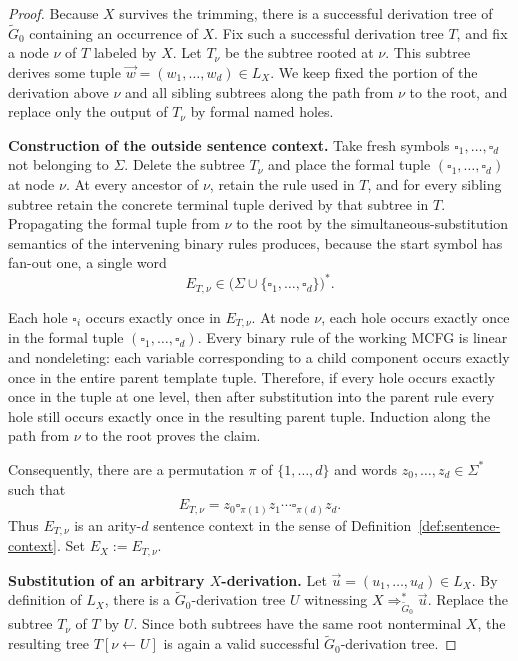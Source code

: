 \documentclass[11pt,a4paper]{article}
\theoremstyle{remark}
\newcommand{\tuple}[1]{\vec{#1}}
\newcommand{\blank}{\square}
\begin{document}
\begin{proof}
Because \(X\) survives the trimming, there is a successful derivation tree of
\(\widetilde G_0\) containing an occurrence of \(X\).  Fix such a successful
derivation tree \(T\), and fix a node \(\nu\) of \(T\) labeled by \(X\).  Let
\(T_\nu\) be the subtree rooted at \(\nu\).  This subtree derives some tuple
\(\tuple w=(w_1,\ldots,w_d)\in L_X\).
We keep fixed the portion of the derivation above \(\nu\) and all sibling
subtrees along the path from \(\nu\) to the root, and replace only the output of
\(T_\nu\) by formal named holes.

\medskip
\noindent
\textbf{Construction of the outside sentence context.}
Take fresh symbols \(\blank_1,\ldots,\blank_d\) not belonging to \(\Sigma\).
Delete the subtree \(T_\nu\) and place the formal tuple
\((\blank_1,\ldots,\blank_d)\) at node \(\nu\).  At every ancestor of \(\nu\), retain the rule used in \(T\),
and for every sibling subtree retain the concrete terminal tuple derived by
that subtree in \(T\).  Propagating the formal tuple from \(\nu\) to the root
by the simultaneous-substitution semantics of the intervening binary rules
produces, because the start symbol has fan-out one, a single word
\[
  E_{T,\nu}
  \in
  \bigl(
    \Sigma\cup\{\blank_1,\ldots,\blank_d\}
  \bigr)^*.
\]

Each hole \(\blank_i\) occurs exactly once in \(E_{T,\nu}\).  At node \(\nu\),
each hole occurs exactly once in the formal tuple
\((\blank_1,\ldots,\blank_d)\).  Every binary rule of the working MCFG is
linear and nondeleting: each variable corresponding to a child component
occurs exactly once in the entire parent template tuple.  Therefore, if every
hole occurs exactly once in the tuple at one level, then after substitution
into the parent rule every hole still occurs exactly once in the resulting
parent tuple.  Induction along the path from \(\nu\) to the root proves the
claim.

Consequently, there are a permutation \(\pi\) of \(\{1,\ldots,d\}\) and
words \(z_0,\ldots,z_d\in\Sigma^*\) such that
\[
  E_{T,\nu}
  =
  z_0\blank_{\pi(1)}z_1
  \cdots
  \blank_{\pi(d)}z_d.
\]
Thus \(E_{T,\nu}\) is an arity-\(d\) sentence context in the sense of
Definition~\ref{def:sentence-context}.  Set \(E_X:=E_{T,\nu}\).

\medskip
\noindent
\textbf{Substitution of an arbitrary \(X\)-derivation.}
Let \(\tuple u=(u_1,\ldots,u_d)\in L_X\).  By definition of \(L_X\), there
is a \(\widetilde G_0\)-derivation tree \(U\) witnessing
\(X\Rightarrow_{\widetilde G_0}^*\tuple u\).
Replace the subtree \(T_\nu\) of \(T\) by \(U\).  Since both subtrees have the
same root nonterminal \(X\), the resulting tree
\(T[\nu\leftarrow U]\) is again a valid successful \(\widetilde G_0\)-derivation tree.


\end{proof}
\end{document}
